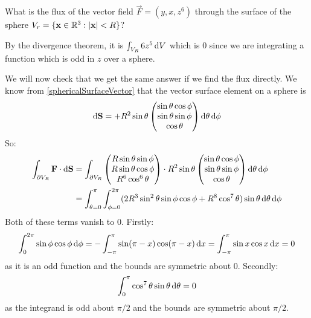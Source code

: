 \documentclass[../main.tex]{subfiles}
\begin{document}
\begin{example}
  What is the flux of the vector field $\vec{F} = (y, x, z^6)$ through the surface of the sphere $V_r = \{\mathbf{\bm{x}} \in \mathbb{R}^3: |\mathbf{\bm{x}}| < R\}$?

  By the divergence theorem, it is $\int_{V_R} 6z^{5} \d{V}$ which is $0$ since we are integrating a function which is odd in $z$ over a sphere.

  We will now check that we get the same answer if we find the flux directly.
  We know from \cref{sphericalSurfaceVector} that the vector surface element on a sphere is
  \[
    \d{\vec{S}} = + R^2 \sin \theta \begin{pmatrix}
    \sin \theta \cos \phi \\
    \sin \theta \sin \phi \\
    \cos \theta \\
    \end{pmatrix} \d{\theta} \d{\phi}
  \]
  So:
  \begin{align*}
    \int_{\partial V_R} \vec{F} \cdot \d{\vec{S}} &= \int_{\partial V_R} \begin{pmatrix}
    R \sin \theta \sin \phi \\
    R \sin \theta \cos \phi \\
    R^{6} \cos^{6} \theta \\
    \end{pmatrix} \cdot R^2 \sin \theta \begin{pmatrix}
    \sin \theta \cos \phi \\
    \sin \theta \sin \phi \\
    \cos \theta \\
    \end{pmatrix} \d{\theta} \d{\phi} \\
                                                  &= \int_{\theta = 0}^{\pi} \int_{\phi = 0}^{2\pi} (2R^3 \sin^2 \theta \sin \phi \cos \phi + R^{8} \cos^7 \theta) \sin \theta \d{\theta} \d{\phi}
  \end{align*}
  Both of these terms vanish to $0$.
  Firstly:
  \[
    \int_{0}^{2\pi} \sin \phi \cos \phi \d{\phi} = -\int_{-\pi}^{\pi} \sin(\pi - x)\cos(\pi - x) \d{x} = \int_{-\pi}^{\pi} \sin x \cos x \d{x} = 0
  \]
  as it is an odd function and the bounds are symmetric about $0$.
  Secondly:
  \[
    \int_{0}^{\pi} \cos^{7} \theta \sin \theta \d{\theta} = 0
  \]
  as the integrand is odd about $\pi/2$ and the bounds are symmetric about $\pi/2$.
\end{example}
\end{document}
